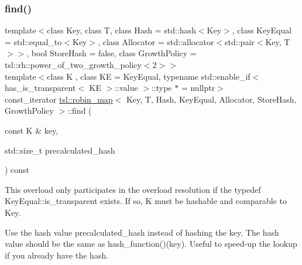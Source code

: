 \subsubsection{\texorpdfstring{find()}{find()}\hspace{0.1cm}{\footnotesize\ttfamily [6/6]}}
{\footnotesize\ttfamily template$<$class Key, class T, class Hash = std\+::hash$<$\+Key$>$, class Key\+Equal = std\+::equal\+\_\+to$<$\+Key$>$, class Allocator = std\+::allocator$<$std\+::pair$<$\+Key, T$>$$>$, bool Store\+Hash = false, class Growth\+Policy = tsl\+::rh\+::power\+\_\+of\+\_\+two\+\_\+growth\+\_\+policy$<$2$>$$>$ \\
template$<$class K , class KE  = Key\+Equal, typename std\+::enable\+\_\+if$<$ has\+\_\+is\+\_\+transparent$<$ K\+E $>$\+::value $>$\+::type $\ast$  = nullptr$>$ \\
const\+\_\+iterator \mbox{\hyperlink{classtsl_1_1robin__map}{tsl\+::robin\+\_\+map}}$<$ Key, T, Hash, Key\+Equal, Allocator, Store\+Hash, Growth\+Policy $>$\+::find (\begin{DoxyParamCaption}\item[{const K \&}]{key,  }\item[{std\+::size\+\_\+t}]{precalculated\+\_\+hash }\end{DoxyParamCaption}) const\hspace{0.3cm}{\ttfamily [inline]}}





This overload only participates in the overload resolution if the typedef Key\+Equal\+::is\+\_\+transparent exists. If so, K must be hashable and comparable to Key.

Use the hash value \textquotesingle{}precalculated\+\_\+hash\textquotesingle{} instead of hashing the key. The hash value should be the same as hash\+\_\+function()(key). Useful to speed-\/up the lookup if you already have the hash. \mbox{\label{classtsl_1_1robin__map_a8d8531a86434e6d837cb71c938be56f5}} 
